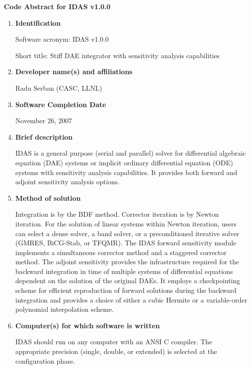 \documentclass[12pt]{letter}
\begin{document}
\pagestyle{empty}

\begin{letter}

\vspace{0.2in}
\centerline{\bf Code Abstract for IDAS v1.0.0}

\begin{enumerate}

\item {\bf Identification}

Software acronym: IDAS v1.0.0

Short title: Stiff DAE integrator with sensitivity analysis capabilities

\item {\bf Developer name(s) and affiliations}

Radu Serban (CASC, LLNL)

\item {\bf Software Completion Date}

November 26, 2007

\item {\bf Brief description}

IDAS is a general purpose (serial and parallel) solver for differential algebraic
equation (DAE) systems or implicit ordinary differential equation (ODE) systems
with sensitivity analysis capabilities. It provides both forward and adjoint
sensitivity analysis options.

\item {\bf Method of solution}

Integration is by the BDF method. Corrector iteration is by Newton iteration. 
For the solution of linear systems within Newton iteration, users can select a 
dense solver, a band solver, or a preconditioned iterative solver (GMRES, BiCG-Stab,
or TFQMR). The IDAS forward sensitivity module implements a simultaneous corrector
method and a staggered corrector method. The adjoint sensitivity provides the
infrastructure required for the backward integration in time of multiple systems of 
differential equations dependent on the solution of the original DAEs. It employs a 
checkpointing scheme for efficient reproduction of forward solutions during the 
backward integration and provides a choice of either a cubic Hermite or a 
variable-order polynomial interpolation scheme.

\item {\bf Computer(s) for which software is written}

IDAS should run on any computer with an ANSI C compiler. The appropriate 
precision (single, double, or extended) is selected at the configuration phase.


\end{enumerate}
\end{letter}
\end{document}

